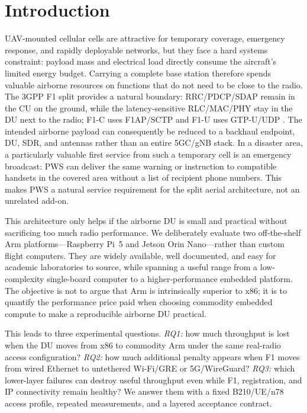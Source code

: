 \documentclass[conference]{IEEEtran}
\begin{document}
\section{Introduction}
UAV-mounted cellular cells are attractive for temporary coverage, emergency
response, and rapidly deployable networks, but they face a hard systems
constraint: payload mass and electrical load directly consume the aircraft's
limited energy budget. Carrying a complete base station therefore spends
valuable airborne resources on functions that do not need to be close to the
radio. The 3GPP F1 split provides a natural boundary: RRC/PDCP/SDAP remain in
the CU on the ground, while the latency-sensitive RLC/MAC/PHY stay in the DU
next to the radio; F1-C uses F1AP/SCTP and F1-U uses GTP-U/UDP
\cite{3gpp38401,3gpp38473}. The intended airborne payload can consequently be
reduced to a backhaul endpoint, DU, SDR, and antennas rather than an entire
5GC/gNB stack. In a disaster area, a particularly valuable first service from
such a temporary cell is an emergency broadcast: PWS can deliver the same
warning or instruction to compatible handsets in the covered area without a
list of recipient phone numbers. This makes PWS a natural service requirement
for the split aerial architecture, not an unrelated add-on.

This architecture only helps if the airborne DU is small and practical
without sacrificing too much radio performance. We deliberately evaluate two
off-the-shelf Arm platforms---Raspberry Pi~5 and Jetson Orin Nano---rather
than custom flight computers. They are widely available, well documented, and
easy for academic laboratories to source, while spanning a useful range from
a low-complexity single-board computer to a higher-performance embedded
platform. The objective is not to argue that Arm is intrinsically superior to
x86; it is to quantify the performance price paid when choosing commodity
embedded compute to make a reproducible airborne DU practical.

This leads to three experimental questions. \emph{RQ1:} how much throughput is
lost when the DU moves from x86 to commodity Arm under the same real-radio
access configuration? \emph{RQ2:} how much additional penalty appears when F1
moves from wired Ethernet to untethered Wi-Fi/GRE or 5G/WireGuard? \emph{RQ3:}
which lower-layer failures can destroy useful throughput even while F1,
registration, and IP connectivity remain healthy? We answer them with a fixed
B210/UE/n78 access profile, repeated measurements, and a layered acceptance
contract.
\end{document}
